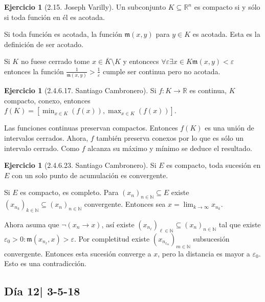 \documentclass[12pt]{article}
\theoremstyle{plain}
\theoremstyle{definition}
\newtheorem{Ej}[Th]{Ejercicio}
\theoremstyle{remark}
\numberwithin{equation}{section}
\newcommand{\bN}{\mathbb{N}}        %
\newcommand{\bR}{\mathbb{R}}        %
\newcommand{\mm}{\mathfrak{m}}      %
\renewcommand{\:}{\colon}           %
\newcommand{\bonj}[1]{\left\lbrack#1\right\rbrack}
\begin{document}
\begin{multicols}{2}
 \begin{Ej}[2.15. Joseph Varilly]
   Un subconjunto $K\subseteq\bR^n$ es compacto si y sólo si toda función en él es acotada.
 \end{Ej}

 \begin{ptcb}
Si toda función es acotada, la función $\mm(x,y)$ para $y\in K$ es acotada. Esta es la definición de ser acotado.\par
Si $K$ no fuese cerrado tome $x\in\overline{K}\setminus K$ y entoncecs $\forall\varepsilon\exists x\in K \mm(x,y)<\varepsilon$ entonces la función $\frac{1}{\mm(x,y)}>\frac{1}{\varepsilon}$ cumple ser continua pero no acotada.
 \end{ptcb}

 \begin{Ej}[2.4.6.17. Santiago Cambronero]
   Si $f\colon K\to \bR$ es continua, $K$ compacto, conexo, entonces $f(K)=\bonj{\min_{x\in K}(f(x)),\max_{x\in K}(f(x))}$.
 \end{Ej}

 \begin{ptcb}
Las funciones continuas preservan compactos. Entonces $f(K)$ es una unión de intervalos cerrados. Ahora, $f$ también preserva conexos por lo que es sólo un intervalo cerrado. Como $f$ alcanza su máximo y mínimo se deduce el resultado.
 \end{ptcb}

 \begin{Ej}[2.4.6.23. Santiago Cambronero]
   Si $E$ es compacto, toda sucesión en $E$ con un solo punto de acumulación es convergente.
 \end{Ej}

 \begin{ptcb}
Si $E$ es compacto, es completo. Para $(x_n)_{n\in\bN}\subseteq E$ existe $(x_{n_k})_{k\in\bN}\subseteq(x_n)_{n\in\bN}$ convergente. Entonces sea $x=\lim_{k\to\infty}x_{n_k}$. \par
Ahora asuma que $\neg(x_n\to x)$, así existe $(x_{n_\ell})_{\ell\in\bN}\subseteq (x_n)_{n\in\bN}$ tal que existe $\varepsilon_0>0\colon\mm(x_{n_\ell},x)>\varepsilon$. Por completitud existe $(x_{n_{\ell_m}})_{m\in\bN}$ subsucesión convergente. Entonces esta sucesión converge a $x$, pero la distancia es mayor a $\varepsilon_0$. Esto es una contradicción.
 \end{ptcb}

\subsection{Día 12| 3-5-18}


\end{multicols}
\end{document}
